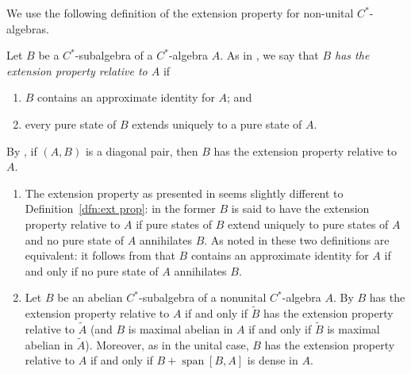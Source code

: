 \documentclass[12pt,a4paper]{amsart}
\newcommand{\lsp}{\operatorname{span}}
\begin{document}
We use the following definition of the extension property for
non-unital $C^*$-algebras.

\begin{defn}\label{dfn:ext prop} %
Let $B$ be a $C^*$-subalgebra of a $C^*$-algebra $A$. As in
\cite[\S2]{Kumjian1985}, we say that \emph{$B$ has the
extension property relative to $A$} if
\begin{enumerate}
\item $B$ contains an approximate identity for $A$; and
\item every pure state of $B$ extends uniquely to a pure
    state of $A$.
\end{enumerate}
\end{defn}

By \cite[Proposition~1.4]{Kumjian1986}, if $(A, B)$ is a
diagonal pair, then $B$ has the extension property relative to
$A$.

\begin{remark}\label{rmk:nonunital}
\begin{enumerate}
\item The extension property as presented in
    \cite[Definition~2.5]{ABG} seems slightly different to
    Definition~\ref{dfn:ext prop}: in the former $B$ is
    said to have the extension property relative to $A$ if
    pure states of $B$ extend uniquely to pure states of
    $A$ and no pure state of $A$ annihilates $B$. As noted
    in \cite[\S 2]{Wassermann2008} these two definitions
    are equivalent: it follows from \cite[Lemma
    2.32]{Akemann-Shultz} that $B$  contains an approximate
    identity for $A$ if and only if no pure state of $A$
    annihilates $B$.

\item Let $B$ be an abelian $C^*$-subalgebra of a nonunital
    $C^*$-algebra $A$. By \cite[Remark~2.6(iii)]{ABG} $B$
    has the extension property relative to $A$ if and only
    if $\widetilde{B}$ has the extension property relative
    to $\widetilde{A}$ (and $B$ is maximal abelian in $A$
    if and only if $\widetilde{B}$ is maximal abelian in
    $\widetilde{A}$). Moreover,  as in the unital case, $B$
    has the extension property relative to $A$ if and only
    if $B + \lsp[B, A]$ is dense in $A$.
\end{enumerate}
\end{remark}
\end{document}
